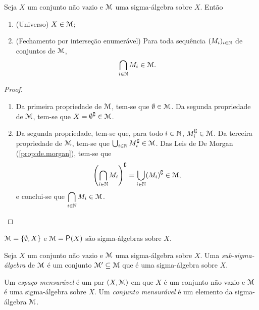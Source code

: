 \begin{proposition}
	Seja $X$ um conjunto não vazio e $\mathcal{M}$ uma sigma-álgebra sobre $X$. Então
	\begin{enumerate}
	\item (Universo) $X \in \mathcal{M}$;
	\item (Fechamento por interseção enumerável) Para toda sequência $(M_i)_{i \in \mathbb{N}}$ de conjuntos de $\mathcal{M}$,
	\begin{equation*}
	\bigcap_{i \in \mathbb{N}} M_i \in \mathcal{M}.
	\end{equation*}
	\end{enumerate}
\end{proposition}
\begin{proof}
	\begin{enumerate}
	\item Da primeira propriedade de $\mathcal{M}$, tem-se que $\emptyset \in \mathcal{M}$. Da segunda propriedade de $\mathcal{M}$, tem-se que $X = \emptyset^\complement \in \mathcal{M}$.
	\item Da segunda propriedade, tem-se que, para todo $i \in \mathbb{N}$, $M_i^\complement \in \mathcal{M}$. Da terceira propriedade de $\mathcal{M}$, tem-se que $\bigcup_{i \in \mathbb{N}} M_i^\complement \in \mathcal{M}$. Das Leis de De Morgan (\ref{prop:de.morgan}), tem-se que
	\begin{equation*}
	\left(\bigcap_{i \in \mathbb{N}} M_i \right)^\complement = \bigcup_{i \in \mathbb{N}} (M_i)^\complement \in \mathcal{M},
	\end{equation*}
e conclui-se que $\displaystyle\bigcap_{i \in \mathbb{N}} M_i \in \mathcal{M}$.
	\end{enumerate}
\end{proof}

\begin{example}
	$\mathcal{M} = \{\emptyset,X\}$ e $\mens = \p(X)$ são sigma-álgebras sobre $X$.
\end{example}

\begin{definition}
Seja $X$ um conjunto não vazio e $\mathcal{M}$ uma sigma-álgebra sobre $X$. Uma \emph{sub-sigma-álgebra} de $\mathcal{M}$ é um conjunto $\mathcal{M}' \subseteq \mathcal{M}$ que é uma sigma-álgebra sobre $X$.
\end{definition}

\begin{definition}
	Um \emph{espaço mensurável} é um par $(X,\mathcal{M})$ em que $X$ é um conjunto não vazio e $\mathcal{M}$ é uma sigma-álgebra sobre $X$. Um \emph{conjunto mensurável} é um elemento da sigma-álgebra $\mathcal{M}$.
\end{definition}

